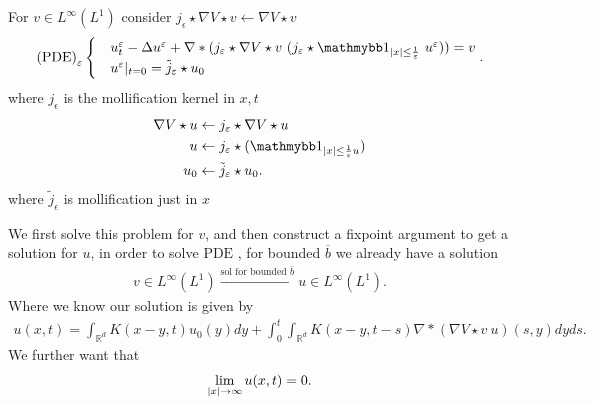 \begin{definition}
  For $v \in  L^{\infty}(L^{1} )$ consider $j_{\epsilon} \star  \nabla  V \star  v \leftarrow \nabla V \star  v $
 \begin{align*}
   \text{(PDE)}_{\epsilon}\begin{cases}
    &u_t^{\epsilon} - \Delta u^{\epsilon}  + \nabla*(j_{\epsilon}\star \nabla V \star  v \ (j_{\epsilon} \star \cha_{\abs{x}\le \frac{1}{\epsilon}} \ u^{\epsilon} )) = v\\
    &u^{\epsilon}  \rvert_{t=0} = \tilde{j}_{\epsilon} \star  u_{0} 
  \end{cases}
 .\end{align*}
where  $j_{\epsilon}$ is the mollification kernel in $x,t$ 
\begin{align*}
  \nabla V \star  u &\leftarrow j_{\epsilon} \star  \nabla V \star  u\\
  u &\leftarrow j_{\epsilon} \star (\cha_{\abs{x} \le  \frac{1}{\epsilon}u})\\
  u_0 &\leftarrow \tilde{j}_{\epsilon}  \star  u_{0}
.\end{align*}
where $\tilde{j}_{\epsilon} $ is mollification just in $x$
\end{definition}
\begin{remark}
  We first solve this problem for $v$, and then construct a fixpoint argument to get a solution for $u$, in order to solve $\text{PDE}$ ,
  for bounded $\overline{b}$ we already have a solution  
  \begin{align*}
    v \in  L^{\infty}(L^{1} ) \xrightarrow{\text{sol for bounded } \overline{b} } u \in  L^{\infty}(L^{1} ) 
  .\end{align*}
  Where we know our solution is given by 
  \begin{align*}
    u(x,t) = \int_{\mathbb{R}^{d} } K(x-y,t)u_{0}(y) dy + \int_0^{t}  \int_{\mathbb{R}^{d} } K(x-y,t-s) \nabla*(\nabla V \star  v \ u)(s,y) dy ds
  .\end{align*}
  We further want that 
  \begin{align*}
    \lim_{\abs{x} \to  \infty}u(x,t) = 0
  .\end{align*}
\end{remark}
